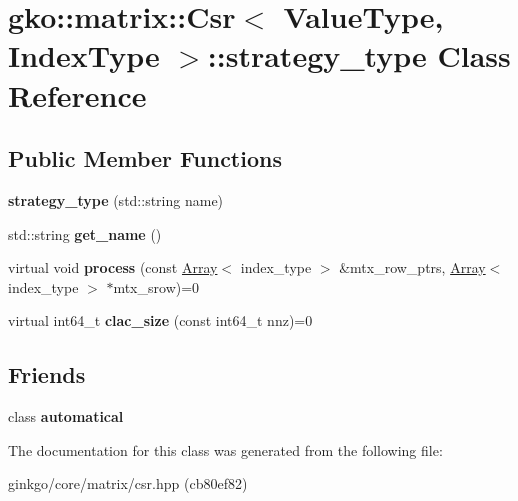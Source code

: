 \hypertarget{classgko_1_1matrix_1_1Csr_1_1strategy__type}{}\section{gko\+:\+:matrix\+:\+:Csr$<$ Value\+Type, Index\+Type $>$\+:\+:strategy\+\_\+type Class Reference}
\label{classgko_1_1matrix_1_1Csr_1_1strategy__type}
\subsection*{Public Member Functions}
\begin{DoxyCompactItemize}
\item 
\mbox{\label{classgko_1_1matrix_1_1Csr_1_1strategy__type_aae6804f7a0b899f03bc0d5e0f139129c}} 
{\bfseries strategy\+\_\+type} (std\+::string name)
\item 
\mbox{\label{classgko_1_1matrix_1_1Csr_1_1strategy__type_a0c22b251b0c1dfd087a5c097488febe0}} 
std\+::string {\bfseries get\+\_\+name} ()
\item 
\mbox{\label{classgko_1_1matrix_1_1Csr_1_1strategy__type_a58bda9208766e57d861262d4059b65b4}} 
virtual void {\bfseries process} (const \hyperlink{classgko_1_1Array}{Array}$<$ index\+\_\+type $>$ \&mtx\+\_\+row\+\_\+ptrs, \hyperlink{classgko_1_1Array}{Array}$<$ index\+\_\+type $>$ $\ast$mtx\+\_\+srow)=0
\item 
\mbox{\label{classgko_1_1matrix_1_1Csr_1_1strategy__type_a07a6dda9dd04ed8abd914f3a69f330f2}} 
virtual int64\+\_\+t {\bfseries clac\+\_\+size} (const int64\+\_\+t nnz)=0
\end{DoxyCompactItemize}
\subsection*{Friends}
\begin{DoxyCompactItemize}
\item 
\mbox{\label{classgko_1_1matrix_1_1Csr_1_1strategy__type_a9e1e07b9f14479534a4043eefd6320cc}} 
class {\bfseries automatical}
\end{DoxyCompactItemize}


The documentation for this class was generated from the following file\+:\begin{DoxyCompactItemize}
\item 
ginkgo/core/matrix/csr.\+hpp (cb80ef82)\end{DoxyCompactItemize}
